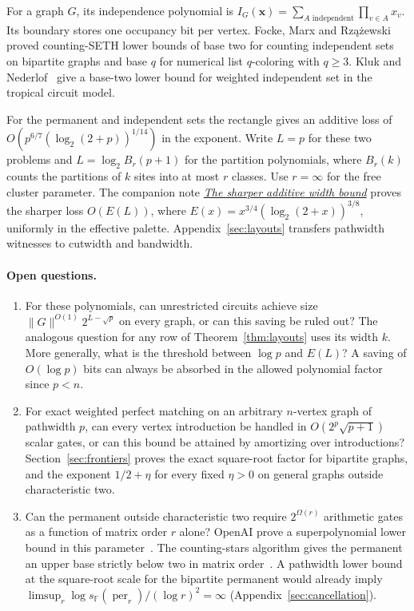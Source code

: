 \documentclass[11pt]{article}
\theoremstyle{definition}
\newcommand{\F}{\mathbb F}
\newcommand{\per}{\operatorname{per}}
\begin{document}
For a graph \(G\), its independence polynomial is \(I_G(\mathbf x)=\sum_{A\text{ independent}}\prod_{v\in A}x_v\). Its boundary stores one occupancy bit per vertex.
Focke, Marx and Rz\k{a}\.{z}ewski~\cite[Theorem~4.6 and Corollary~4.7]{fmr-counting} proved counting-SETH lower bounds of base two for counting independent sets on bipartite graphs and base \(q\) for numerical list \(q\)-coloring with \(q\ge3\).
Kluk and Nederlof~\cite[Theorem~1.1]{kluk-nederlof} give a base-two lower bound for weighted independent set in the tropical circuit model.

For the permanent and independent sets the rectangle gives an additive loss of
\(O(p^{6/7}(\log_2(2+p))^{1/14})\) in the exponent. Write \(L=p\) for these two problems and \(L=\log_2 B_r(p+1)\) for the partition polynomials, where \(B_r(k)\) counts the partitions of \(k\) sites into at most \(r\) classes. Use \(r=\infty\) for the free cluster parameter. The companion note \href{sharper-additive-bound.md}{\emph{The sharper additive width bound}} proves the sharper loss \(O(E(L))\), where \(E(x)=x^{3/4}(\log_2(2+x))^{3/8}\), uniformly in the effective palette. Appendix~\ref{sec:layouts} transfers pathwidth witnesses to cutwidth and bandwidth.

\paragraph{Open questions.}
\begin{enumerate}[leftmargin=*,label=\textnormal{(\arabic*)}]
\item For these polynomials, can unrestricted circuits achieve size \(\|G\|^{O(1)}2^{L-\sqrt p}\) on every graph, or can this saving be ruled out? The analogous question for any row of Theorem~\ref{thm:layouts} uses its width \(k\). More generally, what is the threshold between \(\log p\) and \(E(L)\)? A saving of \(O(\log p)\) bits can always be absorbed in the allowed polynomial factor since \(p<n\).
\item For exact weighted perfect matching on an arbitrary \(n\)-vertex graph of pathwidth \(p\), can every vertex introduction be handled in \(O(2^p\sqrt{p+1})\) scalar gates, or can this bound be attained by amortizing over introductions? Section~\ref{sec:frontiers} proves the exact square-root factor for bipartite graphs, and the exponent \(1/2+\eta\) for every fixed \(\eta>0\) on general graphs outside characteristic two.

\item Can the permanent outside characteristic two require \(2^{\Omega(r)}\) arithmetic gates as a function of matrix order \(r\) alone? OpenAI prove a superpolynomial lower bound in this parameter~\cite{circuits}. The counting-stars algorithm gives the permanent an upper base strictly below two in matrix order~\cite{stars}. A pathwidth lower bound at the square-root scale for the bipartite permanent would already imply \(\limsup_r\log s_{\F}(\per_r)/(\log r)^2=\infty\) (Appendix~\ref{sec:cancellation}).

\end{enumerate}
\end{document}
